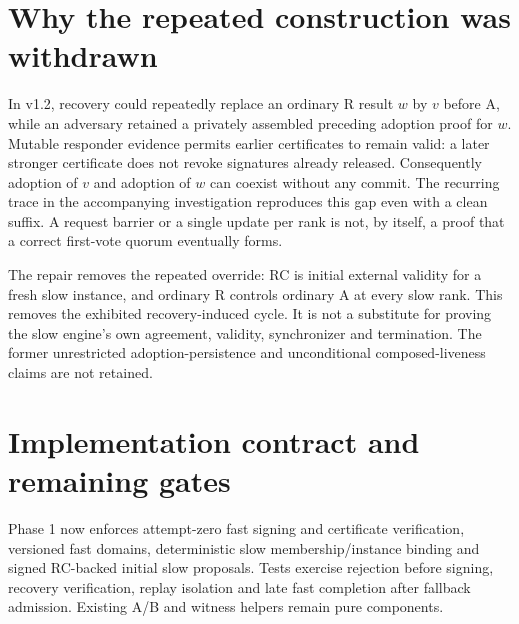 \documentclass[11pt]{article}
\begin{document}
\section{Why the repeated construction was withdrawn}
In v1.2, recovery could repeatedly replace an ordinary R result $w$ by $v$ before
A, while an adversary retained a privately assembled preceding adoption proof
for $w$. Mutable responder evidence permits earlier certificates to remain valid:
a later stronger certificate does not revoke signatures already released.
Consequently adoption of $v$ and adoption of $w$ can coexist without any commit.
The recurring trace in the accompanying investigation reproduces this gap even
with a clean suffix. A request barrier or a single update per rank is not, by
itself, a proof that a correct first-vote quorum eventually forms.

The repair removes the repeated override: RC is initial external validity for a
fresh slow instance, and ordinary R controls ordinary A at every slow rank.
This removes the exhibited recovery-induced cycle. It is not a substitute for
proving the slow engine's own agreement, validity, synchronizer and termination.
The former unrestricted adoption-persistence and unconditional composed-liveness
claims are not retained.

\section{Implementation contract and remaining gates}
Phase 1 now enforces attempt-zero fast signing and certificate verification,
versioned fast domains, deterministic slow membership/instance binding and signed
RC-backed initial slow proposals. Tests exercise rejection before signing,
recovery verification, replay isolation and late fast completion after fallback
admission. Existing A/B and witness helpers remain pure components.
\end{document}
